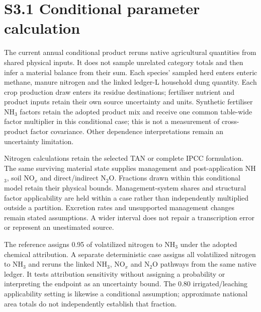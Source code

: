 \section*{S3.1 Conditional parameter calculation}

The current annual conditional product reruns native agricultural quantities from
shared physical inputs. It does not sample unrelated category totals and then
infer a material balance from their sum. Each species' sampled herd enters
enteric methane, manure nitrogen and the linked ledger-L household dung quantity.
Each crop production draw enters its residue destinations; fertiliser nutrient
and product inputs retain their own source uncertainty and units. Synthetic
fertiliser NH$_3$ factors retain the adopted product mix and receive one common
table-wide factor multiplier in this conditional case; this is not a measurement
of cross-product factor covariance. Other dependence interpretations remain an
uncertainty limitation.

Nitrogen calculations retain the selected TAN or complete IPCC formulation.
The same surviving material state supplies management and post-application
NH$_3$, soil NO$_x$ and direct/indirect N$_2$O. Fractions drawn within this
conditional model retain their physical bounds. Management-system shares and
structural factor applicability are held within a case rather than independently
multiplied outside a partition. Excretion rates and unsupported management changes
remain stated assumptions. A wider interval does not repair a transcription
error or represent an unestimated source.

The reference assigns 0.95 of volatilized nitrogen to NH$_3$ under the adopted
chemical attribution. A separate deterministic case assigns all volatilized
nitrogen to NH$_3$ and reruns the linked NH$_3$, NO$_x$ and N$_2$O pathways from
the same native ledger. It tests attribution sensitivity without assigning a
probability or interpreting the endpoint as an uncertainty bound. The 0.80
irrigated/leaching applicability setting is likewise a conditional assumption;
approximate national area totals do not independently establish that fraction.

